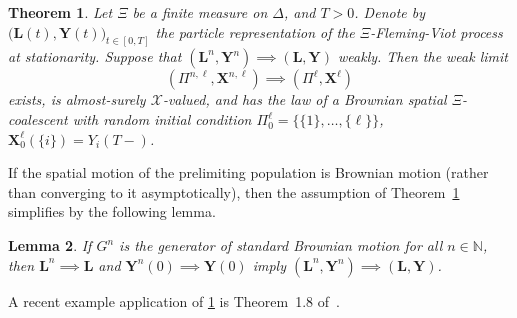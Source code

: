 \documentclass[reqno,draft]{amsart}
\numberwithin{equation}{section}
\theoremstyle{plain}
\newtheorem{theorem}{Theorem}[section]
\newtheorem{lemma}[theorem]{Lemma}
\theoremstyle{remark}
\newcommand{\N}{\mathbb{N}} %
\newcommand{\fpart}{\Pi} %
\begin{document}
\begin{theorem}\label{thm:neutralgenealogy}
    Let $\Xi$ be a finite measure on $\Delta$, and $T > 0$. Denote by $\boldsymbol (\boldsymbol L(t),\boldsymbol Y(t))_{t\in [0,T]}$ the particle representation of the $\Xi$-Fleming-Viot process at stationarity.  %
    Suppose that $(\boldsymbol L^n,\boldsymbol Y^n) \implies (\boldsymbol L,\boldsymbol Y)$ weakly. Then the weak limit \[
        (\fpart^{n,\ell},\boldsymbol X^{n,\ell}) \implies (\fpart^\ell, \boldsymbol X^\ell)
    \] exists, is almost-surely $\mathcal{X}$-valued, and has the law of a Brownian spatial $\Xi$-coalescent with random initial condition $\fpart^\ell_0 = \{\{1\}, \ldots ,\{\ell\}\}$, $\boldsymbol X^\ell_0(\{i\}) = Y_i(T-)$.
\end{theorem}

If the spatial motion of the prelimiting population is Brownian motion (rather than converging to it asymptotically), then the assumption of Theorem~\ref{thm:neutralgenealogy} simplifies by the following lemma.

\begin{lemma}\label{lem:simplerassumption}
    If $G^n$ is the generator of standard Brownian motion for all $n\in \N$, then $\boldsymbol L^n \implies \boldsymbol L$ and $\boldsymbol Y^n(0) \implies \boldsymbol Y(0)$ imply $(\boldsymbol L^n,\boldsymbol Y^n) \implies (\boldsymbol L, \boldsymbol Y)$.
\end{lemma}


A recent example application of \cref{thm:neutralgenealogy} is Theorem~1.8 of~\cite{ruairi}.
\end{document}
